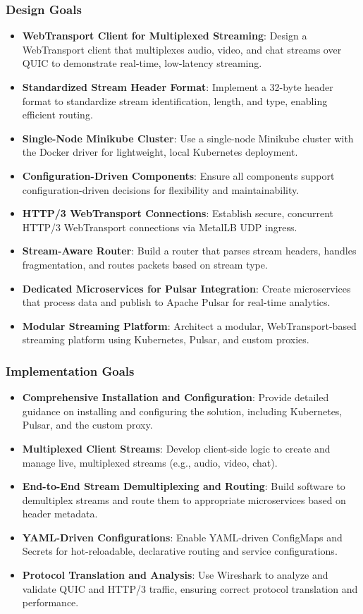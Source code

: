 {\subsubsection*{Design Goals}
\begin{itemize}
    \item \textbf{WebTransport Client for Multiplexed Streaming}: Design a WebTransport client that multiplexes audio, video, and chat streams over QUIC to demonstrate real-time, low-latency streaming.
    \item \textbf{Standardized Stream Header Format}: Implement a 32-byte header format to standardize stream identification, length, and type, enabling efficient routing.
    \item \textbf{Single-Node Minikube Cluster}: Use a single-node Minikube cluster with the Docker driver for lightweight, local Kubernetes deployment.
    \item \textbf{Configuration-Driven Components}: Ensure all components support configuration-driven decisions for flexibility and maintainability.
    \item \textbf{HTTP/3 WebTransport Connections}: Establish secure, concurrent HTTP/3 WebTransport connections via MetalLB UDP ingress.
    \item \textbf{Stream-Aware Router}: Build a router that parses stream headers, handles fragmentation, and routes packets based on stream type.
    \item \textbf{Dedicated Microservices for Pulsar Integration}: Create microservices that process data and publish to Apache Pulsar for real-time analytics.
    \item \textbf{Modular Streaming Platform}: Architect a modular, WebTransport-based streaming platform using Kubernetes, Pulsar, and custom proxies.
\end{itemize}

\subsubsection*{Implementation Goals}
\begin{itemize}
    \item \textbf{Comprehensive Installation and Configuration}: Provide detailed guidance on installing and configuring the solution, including Kubernetes, Pulsar, and the custom proxy.
    \item \textbf{Multiplexed Client Streams}: Develop client-side logic to create and manage live, multiplexed streams (e.g., audio, video, chat).
    \item \textbf{End-to-End Stream Demultiplexing and Routing}: Build software to demultiplex streams and route them to appropriate microservices based on header metadata.
    \item \textbf{YAML-Driven Configurations}: Enable YAML-driven ConfigMaps and Secrets for hot-reloadable, declarative routing and service configurations.
    \item \textbf{Protocol Translation and Analysis}: Use Wireshark to analyze and validate QUIC and HTTP/3 traffic, ensuring correct protocol translation and performance.
\end{itemize}




}
